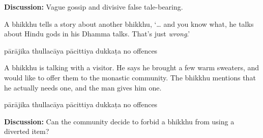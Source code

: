 \begin{exam}{\autoExamName}
\begin{problem*}
\begin{parts}
  \textbf{Discussion:} Vague gossip and divisive false tale-bearing.

  \bigskip

\item A bhikkhu tells a story about another bhikkhu, `\ldots{} and you know
  what, he talks about Hindu gods in his Dhamma talks. That's just
  \textit{wrong}.'

  \bigskip

  \begin{answers}{5}
    \bChoices
     pārājika\eAns
     thullacāya\eAns
     pācittiya\eAns
     dukkaṭa\eAns
     no offences\eAns
    \eChoices
  \end{answers}

  \bigskip

\item A bhikkhu is talking with a visitor. He says he brought a few warm
  sweaters, and would like to offer them to the monastic community. The bhikkhu
  mentions that he actually needs one, and the man gives him one.

  \bigskip

  \begin{answers}{5}
    \bChoices
     pārājika\eAns
     thullacāya\eAns
     pācittiya\eAns
     dukkaṭa\eAns
     no offences\eAns
    \eChoices
  \end{answers}

  \bigskip

  \textbf{Discussion:} Can the community decide to forbid a bhikkhu from using a
  diverted item?

\end{parts}

\end{problem*}

\end{exam}
